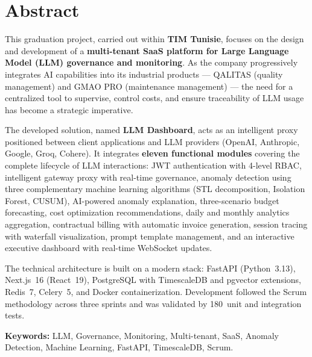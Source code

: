 
\chapter*{Abstract}

\vspace{0.5cm}

This graduation project, carried out within \textbf{TIM Tunisie}, focuses on the design and development of a \textbf{multi-tenant SaaS platform for Large Language Model (LLM) governance and monitoring}. As the company progressively integrates AI capabilities into its industrial products --- QALITAS (quality management) and GMAO PRO (maintenance management) --- the need for a centralized tool to supervise, control costs, and ensure traceability of LLM usage has become a strategic imperative.

The developed solution, named \textbf{LLM Dashboard}, acts as an intelligent proxy positioned between client applications and LLM providers (OpenAI, Anthropic, Google, Groq, Cohere). It integrates \textbf{eleven functional modules} covering the complete lifecycle of LLM interactions: JWT authentication with 4-level RBAC, intelligent gateway proxy with real-time governance, anomaly detection using three complementary machine learning algorithms (STL decomposition, Isolation Forest, CUSUM), AI-powered anomaly explanation, three-scenario budget forecasting, cost optimization recommendations, daily and monthly analytics aggregation, contractual billing with automatic invoice generation, session tracing with waterfall visualization, prompt template management, and an interactive executive dashboard with real-time WebSocket updates.

The technical architecture is built on a modern stack: FastAPI (Python~3.13), Next.js~16 (React~19), PostgreSQL with TimescaleDB and pgvector extensions, Redis~7, Celery~5, and Docker containerization. Development followed the Scrum methodology across three sprints and was validated by 180~unit and integration tests.

\vspace{0.5cm}

\textbf{Keywords:} LLM, Governance, Monitoring, Multi-tenant, SaaS, Anomaly Detection, Machine Learning, FastAPI, TimescaleDB, Scrum.

\newpage
